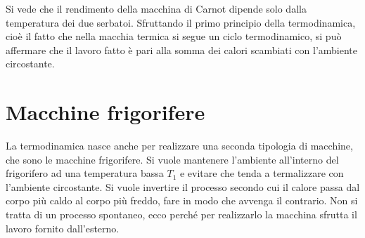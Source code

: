 Si vede che il rendimento della macchina di Carnot dipende solo dalla temperatura dei due serbatoi. Sfruttando il primo principio della termodinamica, cioè il fatto che nella macchia termica si segue un ciclo termodinamico, si può affermare che il lavoro fatto è pari alla somma dei calori scambiati con l'ambiente circostante.

\section{Macchine frigorifere}

La termodinamica nasce anche per realizzare una seconda tipologia di macchine, che sono le macchine frigorifere. Si vuole mantenere l'ambiente all'interno del frigorifero ad una temperatura bassa $T_1$ e evitare che tenda a termalizzare con l'ambiente circostante. Si vuole invertire il processo secondo cui il calore passa dal corpo più caldo al corpo più freddo, fare in modo che avvenga il contrario. Non si tratta di un processo spontaneo, ecco perché per realizzarlo la macchina sfrutta il lavoro fornito dall'esterno.

